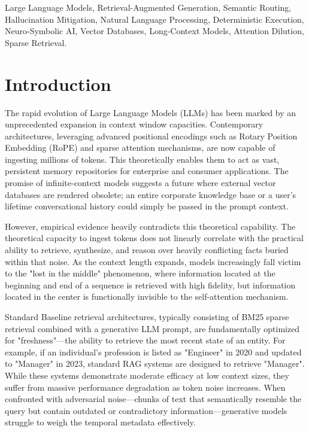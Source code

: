 \documentclass[journal,10pt]{IEEEtran}
\begin{document}
\begin{IEEEkeywords}
Large Language Models, Retrieval-Augmented Generation, Semantic Routing, Hallucination Mitigation, Natural Language Processing, Deterministic Execution, Neuro-Symbolic AI, Vector Databases, Long-Context Models, Attention Dilution, Sparse Retrieval.
\end{IEEEkeywords}

\section{Introduction}
The rapid evolution of Large Language Models (LLMs) has been marked by an unprecedented expansion in context window capacities. Contemporary architectures, leveraging advanced positional encodings such as Rotary Position Embedding (RoPE) and sparse attention mechanisms, are now capable of ingesting millions of tokens. This theoretically enables them to act as vast, persistent memory repositories for enterprise and consumer applications. The promise of infinite-context models suggests a future where external vector databases are rendered obsolete; an entire corporate knowledge base or a user's lifetime conversational history could simply be passed in the prompt context.

However, empirical evidence heavily contradicts this theoretical capability. The theoretical capacity to ingest tokens does not linearly correlate with the practical ability to retrieve, synthesize, and reason over heavily conflicting facts buried within that noise. As the context length expands, models increasingly fall victim to the "lost in the middle" phenomenon, where information located at the beginning and end of a sequence is retrieved with high fidelity, but information located in the center is functionally invisible to the self-attention mechanism. 

Standard Baseline retrieval architectures, typically consisting of BM25 sparse retrieval combined with a generative LLM prompt, are fundamentally optimized for "freshness"—the ability to retrieve the most recent state of an entity. For example, if an individual's profession is listed as "Engineer" in 2020 and updated to "Manager" in 2023, standard RAG systems are designed to retrieve "Manager". While these systems demonstrate moderate efficacy at low context sizes, they suffer from massive performance degradation as token noise increases. When confronted with adversarial noise—chunks of text that semantically resemble the query but contain outdated or contradictory information—generative models struggle to weigh the temporal metadata effectively.
\end{document}
